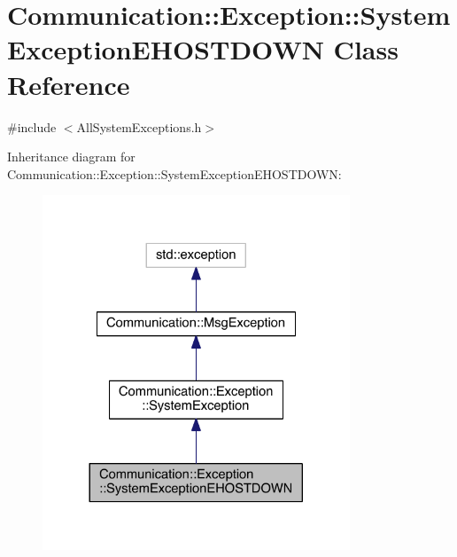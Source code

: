 \hypertarget{class_communication_1_1_exception_1_1_system_exception_e_h_o_s_t_d_o_w_n}{}\section{Communication\+:\+:Exception\+:\+:System\+Exception\+E\+H\+O\+S\+T\+D\+O\+W\+N Class Reference}
\label{class_communication_1_1_exception_1_1_system_exception_e_h_o_s_t_d_o_w_n}


{\ttfamily \#include $<$All\+System\+Exceptions.\+h$>$}



Inheritance diagram for Communication\+:\+:Exception\+:\+:System\+Exception\+E\+H\+O\+S\+T\+D\+O\+W\+N\+:\nopagebreak
\begin{figure}[H]
\begin{center}
\leavevmode
\includegraphics[width=260pt]{class_communication_1_1_exception_1_1_system_exception_e_h_o_s_t_d_o_w_n__inherit__graph}
\end{center}
\end{figure}


